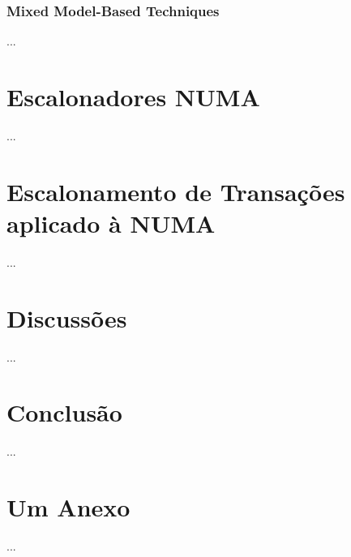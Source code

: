 \documentclass[ti]{texufpel} %
\begin{document}
\subsection{Mixed Model-Based Techniques}

...


\chapter{Escalonadores NUMA}

  ...


\chapter{Escalonamento de Transações aplicado à NUMA}

  ...


\chapter{Discussões}

  ...


\chapter{Conclusão}

  ...





\annex
\chapter{Um Anexo}

  ...
\end{document}
